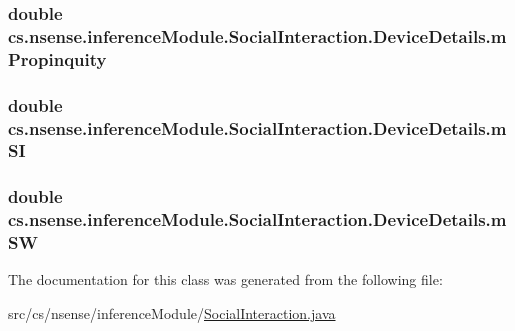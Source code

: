\hypertarget{classcs_1_1nsense_1_1inference_module_1_1_social_interaction_1_1_device_details_a723d838b5f97875b813f05b6d7ccec2d}{
\subsubsection[{m\-Propinquity}]{\setlength{\rightskip}{0pt plus 5cm}double cs.\-nsense.\-inference\-Module.\-Social\-Interaction.\-Device\-Details.\-m\-Propinquity}}\label{classcs_1_1nsense_1_1inference_module_1_1_social_interaction_1_1_device_details_a723d838b5f97875b813f05b6d7ccec2d}
\hypertarget{classcs_1_1nsense_1_1inference_module_1_1_social_interaction_1_1_device_details_abdb4948ecddcb717574d9c365147380c}{
\subsubsection[{m\-S\-I}]{\setlength{\rightskip}{0pt plus 5cm}double cs.\-nsense.\-inference\-Module.\-Social\-Interaction.\-Device\-Details.\-m\-S\-I}}\label{classcs_1_1nsense_1_1inference_module_1_1_social_interaction_1_1_device_details_abdb4948ecddcb717574d9c365147380c}
\hypertarget{classcs_1_1nsense_1_1inference_module_1_1_social_interaction_1_1_device_details_a930736e6b55ac81ece0af6bfd2ea0d40}{
\subsubsection[{m\-S\-W}]{\setlength{\rightskip}{0pt plus 5cm}double cs.\-nsense.\-inference\-Module.\-Social\-Interaction.\-Device\-Details.\-m\-S\-W}}\label{classcs_1_1nsense_1_1inference_module_1_1_social_interaction_1_1_device_details_a930736e6b55ac81ece0af6bfd2ea0d40}


The documentation for this class was generated from the following file\-:\begin{DoxyCompactItemize}
\item 
src/cs/nsense/inference\-Module/\hyperlink{_social_interaction_8java}{Social\-Interaction.\-java}\end{DoxyCompactItemize}
